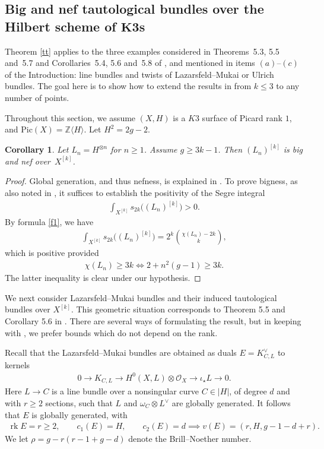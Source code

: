 \documentclass[pdftex]{sigma}
\numberwithin{equation}{section}
\newtheorem{Corollary}[Theorem]{Corollary}
\newcommand{\rk}{\operatorname{rk}}
\begin{document}
\subsection[Big and nef tautological bundles over the Hilbert scheme of K3s]
{Big and nef tautological bundles over the Hilbert scheme of $\boldsymbol{K3}$s} \label{secex}

Theorem \ref{tt} applies to the three examples considered in Theorems~5.3, 5.5 and~5.7 and Corollaries~5.4, 5.6 and~5.8 of \cite{BBF}, and mentioned in items $(a)$--$(c)$ of the Introduction: line bundles and twists of Lazarsfeld--Mukai or Ulrich bundles. The goal here is to show how to extend the results in \cite{BBF} from $k\leq 3$ to any number of points.

Throughout this section, we assume $(X, H)$ is a $K3$ surface of Picard rank $1$, and $\text{Pic}(X)=\mathbb Z\langle H\rangle$. Let $H^2=2g-2$.

\begin{Corollary} \label{c4}Let $L_n=H^{\otimes n}$ for $n\geq 1$. Assume $g\geq 3k-1$. Then $(L_n)^{[k]}$ is big and nef over~$X^{[k]}$.
\end{Corollary}

\begin{proof}
Global generation, and thus nefness, is explained in \cite[Theorem 5.3]{BBF}. To prove bigness, as also noted in \cite{BBF}, it suffices to establish the positivity of the Segre integral
\begin{gather*}
\int_{X^{[k]}} s_{2k} \big((L_n)^{[k]}\big)>0.
\end{gather*}
By formula \eqref{f1}, we have
\begin{gather*}
\int_{X^{[k]}} s_{2k} \big((L_n)^{[k]}\big)=2^k \binom{\chi(L_n)-2k}{k},
\end{gather*}
which is positive provided
\begin{gather*}
\chi(L_n)\geq 3k\iff 2+n^2(g-1)\geq 3k.
\end{gather*}
The latter inequality is clear under our hypothesis.
\end{proof}


We next consider Lazarsfeld--Mukai bundles and their induced tautological bundles over $X^{[k]}$. This geometric situation corresponds to Theorem 5.5 and Corollary 5.6 in \cite{BBF}. There are several ways of formulating the result, but in keeping with \cite{BBF}, we prefer bounds which do not depend on the rank.

Recall that the Lazarsfeld--Mukai bundles are obtained as duals $E=K_{C, L}^{\vee}$ to kernels
\begin{gather*}
0\to K_{C, L}\to H^0(X, L)\otimes \mathcal O_X\to \iota_{\star} L\to 0.
\end{gather*}
Here $L\to C$ is a line bundle over a nonsingular curve $C\in |H|$, of degree $d$ and with $r\geq 2$ sections, such that $L$ and $\omega_C\otimes L^{\vee}$ are globally generated. It follows that $E$ is globally generated, with
\begin{gather*}
\rk E=r\geq 2, \qquad c_1(E)=H, \qquad c_2(E)=d\implies v(E)=(r, H, g-1-d+r).
\end{gather*}
We let $\rho=g-r(r-1+g-d)$ denote the Brill--Noether number.
\end{document}
